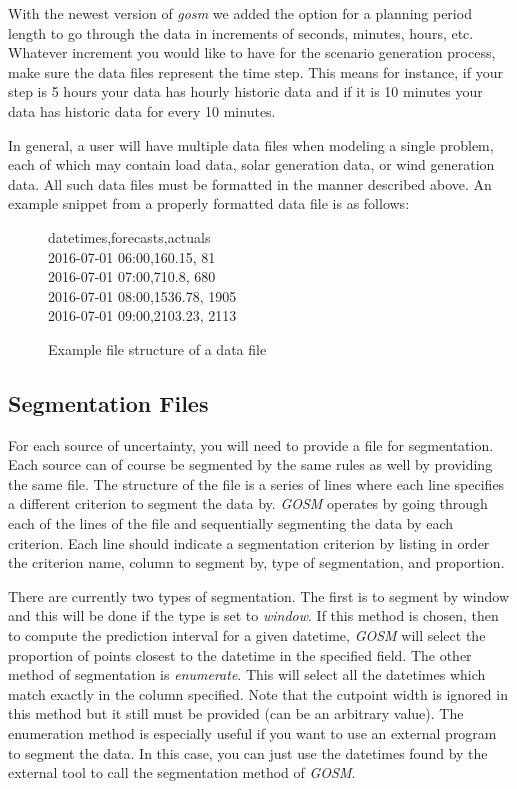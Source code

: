 \documentclass[11pt]{article}
\begin{document}
With the newest version of \textit{gosm} we added the option for a planning period length to go through the data in increments of seconds, minutes, hours, etc. Whatever increment you would like to have for the scenario generation process, make sure the data files represent the time step. This means for instance, if your step is 5 hours your data has hourly historic data and if it is 10 minutes your data has historic data for every 10 minutes.

In general, a user will have multiple data files when modeling a single problem, each of which may contain load data, solar generation data, or wind generation data. All such data files must be formatted in the manner described above. An example snippet from a properly formatted data file is as follows:
\begin{figure}[H]
	\begin{framed}
		\noindent
		datetimes,forecasts,actuals\\
		2016-07-01 06:00,160.15, 81\\
		2016-07-01 07:00,710.8, 680\\
		2016-07-01 08:00,1536.78, 1905\\
		2016-07-01 09:00,2103.23, 2113
	\end{framed}
	\caption{Example file structure of a data file}
	\label{fig:structure_data}
\end{figure}



\subsection{Segmentation Files}
For each source of uncertainty, you will need to provide a file for segmentation. Each source can of course be segmented by the same rules as well by providing the same file.
The structure of the file is a series of lines where each line specifies a different criterion to segment the data by. \textit{GOSM} operates by going through each of the lines of the file and sequentially segmenting the data by each criterion. Each line should indicate a segmentation criterion by listing in order the criterion name, column to segment by, type of segmentation, and proportion. 
\bigskip

There are currently two types of segmentation. The first is to segment by window and this will be done if the type is set to \textit{window}. If this method is chosen, then to compute the prediction interval for a given datetime, \textit{GOSM} will select the proportion of points closest to the datetime in the specified field. The other method of segmentation is \textit{enumerate}. This will select all the datetimes which match exactly in the column specified. Note that the cutpoint width is ignored in this method but it still must be provided (can be an arbitrary value). The enumeration method is especially useful if you want to use an external program to segment the data. In this case, you can just use the datetimes found by the external tool to call the segmentation method of \textit{GOSM}.
\bigskip
\end{document}
